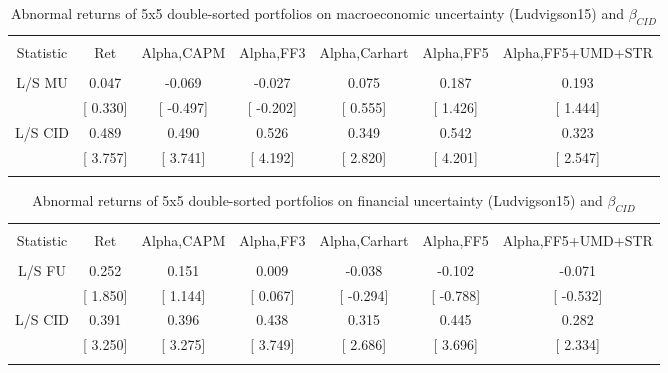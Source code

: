 \documentclass[16pt]{article}
\begin{document}
\begin{table}[!htbp] \centering 
  \caption{Abnormal returns of 5x5 double-sorted portfolios on macroeconomic uncertainty (Ludvigson15) and $\beta_{CID}$} 
  \label{} 
\begin{tabular}{@{\extracolsep{5pt}} ccccccc} 
\\[-1.8ex]\hline 
\hline \\[-1.8ex] 
Statistic & Ret & Alpha,CAPM & Alpha,FF3 & Alpha,Carhart & Alpha,FF5 & Alpha,FF5+UMD+STR \\ 
\hline \\[-1.8ex] 
L/S MU & 0.047 & -0.069 & -0.027 & 0.075 & 0.187 & 0.193 \\ 
& [ 0.330] & [ -0.497] & [ -0.202] & [ 0.555] & [ 1.426] & [ 1.444] \\ 
L/S CID & 0.489 & 0.490 & 0.526 & 0.349 & 0.542 & 0.323 \\ 
& [ 3.757] & [ 3.741] & [ 4.192] & [ 2.820] & [ 4.201] & [ 2.547] \\ 
\hline \\[-1.8ex] 
\end{tabular} 
\end{table}


\begin{table}[!htbp] \centering 
  \caption{Abnormal returns of 5x5 double-sorted portfolios on financial uncertainty (Ludvigson15) and $\beta_{CID}$} 
  \label{} 
\begin{tabular}{@{\extracolsep{5pt}} ccccccc} 
\\[-1.8ex]\hline 
\hline \\[-1.8ex] 
Statistic & Ret & Alpha,CAPM & Alpha,FF3 & Alpha,Carhart & Alpha,FF5 & Alpha,FF5+UMD+STR \\ 
\hline \\[-1.8ex] 
L/S FU & 0.252 & 0.151 & 0.009 & -0.038 & -0.102 & -0.071 \\ 
& [ 1.850] & [ 1.144] & [ 0.067] & [ -0.294] & [ -0.788] & [ -0.532] \\ 
L/S CID & 0.391 & 0.396 & 0.438 & 0.315 & 0.445 & 0.282 \\ 
& [ 3.250] & [ 3.275] & [ 3.749] & [ 2.686] & [ 3.696] & [ 2.334] \\ 
\hline \\[-1.8ex] 
\end{tabular} 
\end{table}
\end{document}

